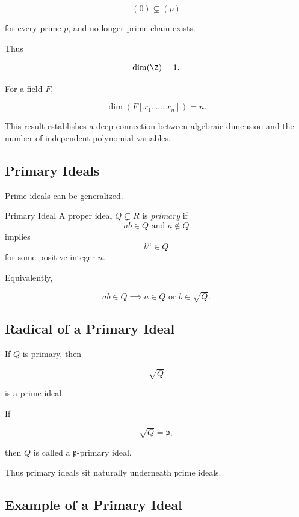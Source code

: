 \[ (0)\subsetneq(p) \]

for every prime \(p\), and no longer prime chain exists.

Thus

\[ \dim(\Z)=1. \]

For a field \(F\),

\[ \dim(F[x_1,\ldots,x_n])=n. \]

This result establishes a deep connection between algebraic dimension and the
number of independent polynomial variables.

\subsection{Primary Ideals}
\label{subsec:primary-ideals}

Prime ideals can be generalized.

\begin{definitionbox}{Primary Ideal}
A proper ideal \(Q\subsetneq R\) is \emph{primary} if
\[ ab\in Q\text{ and }a\notin Q \]
implies
\[ b^n\in Q \]
for some positive integer \(n\).
\end{definitionbox}

Equivalently,

\[ ab\in Q\implies a\in Q\text{ or }b\in\sqrt{Q}. \]

\subsection{Radical of a Primary Ideal}
\label{subsec:radical-primary}

If \(Q\) is primary, then

\[ \sqrt{Q} \]

is a prime ideal.

If

\[ \sqrt{Q}=\mathfrak p, \]

then \(Q\) is called a \(\mathfrak p\)-primary ideal.

Thus primary ideals sit naturally underneath prime ideals.

\subsection{Example of a Primary Ideal}
\label{subsec:primary-ideal-example}

